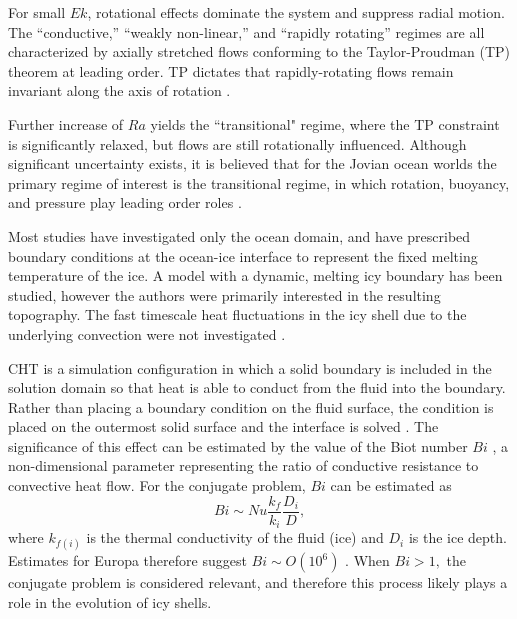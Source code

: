 \documentclass{article}
\def\lb{\left(}
\def\rb{\right)}
\begin{document}
For small $Ek$, rotational effects dominate the system and suppress radial motion. The ``conductive,'' ``weakly non-linear,'' and ``rapidly rotating'' regimes\citep{tG16,kJ12} are all characterized by axially stretched flows conforming to the Taylor-Proudman (TP) theorem at leading order. TP dictates that rapidly-rotating flows remain invariant along the axis of rotation \citep{gB53}.

Further increase of $Ra$ yields the ``transitional" regime, where the TP constraint is significantly relaxed, but flows are still rotationally influenced.
Although significant uncertainty exists, it is believed that for the Jovian ocean worlds the primary regime of interest is the transitional regime, in which rotation, buoyancy, and pressure play leading order roles \citep{dL23,tG16}.

Most studies \citep{kS19, dL23} have investigated only the ocean domain, and have prescribed boundary conditions at the ocean-ice interface to represent the fixed melting temperature of the ice. 
A model with a dynamic, melting icy boundary has been studied, however the authors were primarily interested in the resulting topography. The fast timescale heat fluctuations in the icy shell due to the underlying convection were not investigated \citep{jK24}. 

CHT is a simulation configuration in which a solid boundary is included in the solution domain so that heat is able to conduct from the fluid into the boundary. Rather than placing a boundary condition on the fluid surface, the condition is placed on the outermost solid surface and the interface is solved \citep{dA09}. The significance of this effect can be estimated by the value of the Biot number $Bi$ \citep{dA09,jL24}, a non-dimensional parameter representing the ratio of conductive resistance to convective heat flow. For the conjugate problem, $Bi$ can be estimated as
\[Bi \sim Nu\frac{k_{f}}{k_{i}}\frac{D_{i}}{D},\]
where $k_{f\lb i\rb }$ is the thermal conductivity of the fluid (ice) and $D_{i}$ is the ice depth.
Estimates for Europa therefore suggest $Bi \sim O\lb 10^{6}\rb$ \citep{dL23}. When $Bi>1,$ the conjugate problem is considered relevant, and therefore this process likely plays a role in the evolution of icy shells.
\end{document}
